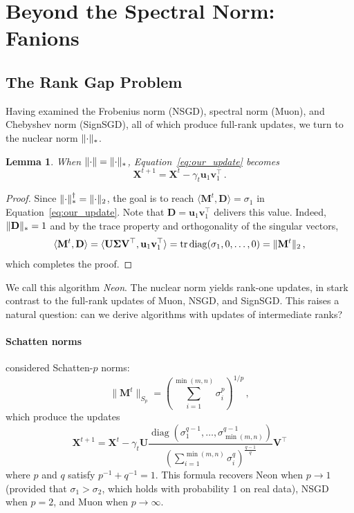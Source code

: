 \documentclass[a4paper,14pt,oneside]{extarticle}
\newtheorem{lemma}{Lemma}
\newcommand{\norm}[1]{\lVert #1\rVert}
\DeclarePairedDelimiter{\norms}{\|}{\|_{\mathrm{2}}}
\DeclarePairedDelimiter{\normn}{\|}{\|_{*}}
\def\<#1,#2>{\langle #1,#2\rangle}
\DeclareMathOperator{\tr}{tr}
\DeclareMathOperator{\diag}{diag}
\newcommand{\vu}{\mathbf{u}}
\newcommand{\vv}{\mathbf{v}}
\newcommand{\mX}{\mathbf{X}}
\newcommand{\mM}{\mathbf{M}}
\newcommand{\mD}{\mathbf{D}}
\newcommand{\mU}{\mathbf{U}}
\newcommand{\mV}{\mathbf{V}}
\newcommand{\mSigma}{\mathbf{\Sigma}}
\newcommand{\equationref}[1]{Equation~\ref{#1}}
\begin{document}
\section{Beyond the Spectral Norm: Fanions}

\subsection{The Rank Gap Problem}\label{sec:rank_gap}

Having examined the Frobenius norm (NSGD), spectral norm (Muon), and Chebyshev norm (SignSGD), all of which produce full-rank updates, we turn to the nuclear norm $\normn{\cdot}$.

\begin{lemma}\label{lemma:neon_update}
  When $\norm{\cdot} = \normn{\cdot}$, \equationref{eq:our_update} becomes
  \begin{equation}\label{eq:neon_update}
    \mX^{t+1} = \mX^{t} - \gamma_t \vu_1 \vv_1^\top\,.
  \end{equation}
\end{lemma}
\begin{proof}
Since $\normn{\cdot}^\dagger = \norms{\cdot}$, the goal is to reach $\<\mM^t, \mD> = \sigma_1$ in \equationref{eq:our_update}. Note that $\mD = \vu_1 \vv_1^\top$ delivers this value. Indeed, $\normn{\mD}=1$ and by the trace property and orthogonality of the singular vectors,
\[
\<\mM^t, \mD> =\<\mU \mSigma \mV^\top, \vu_1 \vv_1^\top> = \tr \diag({\sigma_1, 0, \dots, 0}) = \norms{\mM^t}\,,
\]
which completes the proof.
\end{proof}

We call this algorithm \emph{Neon}. The nuclear norm yields rank-one updates, in stark contrast to the full-rank updates of Muon, NSGD, and SignSGD. This raises a natural question: can we derive algorithms with updates of intermediate ranks?

\paragraph{Schatten norms}
\citet{cesista2025schattenp} considered Schatten-$p$ norms:
\[\norm{\mM^t}_{S_p} = \left(\sum_{i=1}^{\min(m, n)}\sigma_i^p\right)^{1/p}\,,
\]
which produce the updates
\[
\mX^{t+1} = \mX^t - \gamma_t \mU \frac{\diag\left(\sigma_1^{q-1},\dots, \sigma_{\min(m,n)}^{q-1}\right)}{\left(\sum_{i=1}^{\min(m,n)}{\sigma_i^q}\right)^{\frac{q-1}{q}}}\mV^\top
\]
where $p$ and $q$ satisfy $p^{-1} + q^{-1} = 1$. This formula recovers Neon when $p\rightarrow1$ (provided that $\sigma_1 > \sigma_2$, which holds with probability 1 on real data), NSGD when $p=2$, and Muon when $p\rightarrow\infty$.
\end{document}
